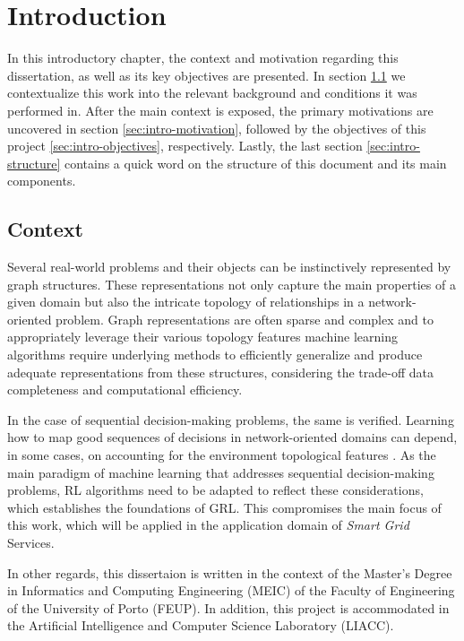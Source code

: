 
\chapter{Introduction} \label{chap:intro}

In this introductory chapter, the context and motivation regarding this dissertation, as well as its key objectives are presented. In section \ref{sec:intro-context} we contextualize this work into the relevant background and conditions it was performed in. After the main context is exposed, the primary motivations are uncovered in section \ref{sec:intro-motivation}, followed by the objectives of this project \ref{sec:intro-objectives}, respectively. Lastly, the last section \ref{sec:intro-structure} contains a quick word on the structure of this document and its main components.

\section{Context} \label{sec:intro-context}

Several real-world problems and their objects can be instinctively represented by graph structures. These representations not only capture the main properties of a given domain but also the intricate topology of relationships in a network-oriented problem. Graph representations are often sparse and complex and to appropriately leverage their various topology features   machine learning algorithms require underlying methods to efficiently generalize and produce adequate representations from these structures, considering the trade-off data completeness and computational efficiency. \par
In the case of sequential decision-making problems, the same is verified. Learning how to map good sequences of decisions in network-oriented domains can depend, in some cases, on accounting for the environment topological features \cite{chenScalableGraphReinforcement2023, xingBilevelGraphReinforcement2023, xingGraphReinforcementLearningBased2023, zhaoGraphbasedDeepReinforcement2022}. As the main paradigm of machine learning that addresses sequential decision-making problems, \ac{RL} algorithms need to be adapted to reflect these considerations, which establishes the foundations of \acf{GRL}. This compromises the main focus of this work, which will be applied in the application domain of \textit{Smart Grid} Services. \par
In other regards, this dissertaion is written in the context of the Master's Degree in Informatics and Computing Engineering (MEIC) of the Faculty of Engineering of the University of Porto (FEUP).  In addition, this project is accommodated in the Artificial Intelligence and Computer Science Laboratory (LIACC). \par



